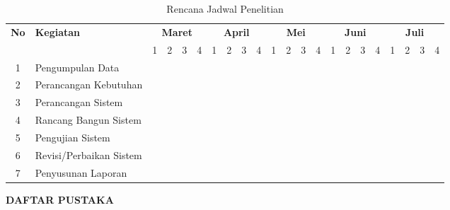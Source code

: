 \documentclass[12pt, a4paper, onecolumn, oneside]{report}
\begin{document}
\begin{spacing}{1.5}
\begin{table}[H]
\centering
\caption{Rencana Jadwal Penelitian}
\label{tab:jadwal}
\small
\begin{tabular}{|c|p{2.2cm}|cccccccccccccccccccc|}
\hline
\multirow{2}{*}{\textbf{No}} & \multirow{2}{*}{\textbf{Kegiatan}} & \multicolumn{4}{c}{\textbf{Maret}} & \multicolumn{4}{c}{\textbf{April}} & \multicolumn{4}{c}{\textbf{Mei}} & \multicolumn{4}{c}{\textbf{Juni}} & \multicolumn{4}{c}{\textbf{Juli}} \\
\cline{3-22}
 & & 1 & 2 & 3 & 4 & 1 & 2 & 3 & 4 & 1 & 2 & 3 & 4 & 1 & 2 & 3 & 4 & 1 & 2 & 3 & 4 \\
\hline
1 & Pengumpulan Data & \cellcolor{black} & \cellcolor{black} & \cellcolor{black} & \cellcolor{black} &  &  &  &  &  &  &  &  &  &  &  &  &  &  &  &  \\
\hline
2 & Perancangan Kebutuhan &  &  & \cellcolor{black} & \cellcolor{black} & \cellcolor{black} & \cellcolor{black} &  &  &  &  &  &  &  &  &  &  &  &  &  &  \\
\hline
3 & Perancangan Sistem &  &  &  &  &  &  & \cellcolor{black} & \cellcolor{black} & \cellcolor{black} & \cellcolor{black} &  &  &  &  &  &  &  &  &  &  \\
\hline
4 & Rancang Bangun Sistem &  &  &  &  &  &  &  &  &  &  & \cellcolor{black} & \cellcolor{black} & \cellcolor{black} & \cellcolor{black} & \cellcolor{black} & \cellcolor{black} & \cellcolor{black} &  &  &  \\
\hline
5 & Pengujian Sistem &  &  &  &  &  &  &  &  &  &  &  &  &  &  &  &  & \cellcolor{black} & \cellcolor{black} & \cellcolor{black} &  \\
\hline
6 & Revisi/Perbaikan Sistem &  &  &  &  &  &  &  &  &  &  &  &  &  &  &  &  &  & \cellcolor{black} & \cellcolor{black} & \cellcolor{black} \\
\hline
7 & Penyusunan Laporan &  &  &  &  &  &  &  &  &  &  &  &  &  &  &  &  &  &  & \cellcolor{black} & \cellcolor{black} \\
\hline
\end{tabular}
\end{table}

\end{spacing}

\newpage
\begin{center}
{\large\bfseries DAFTAR PUSTAKA}
\end{center}
\end{document}
